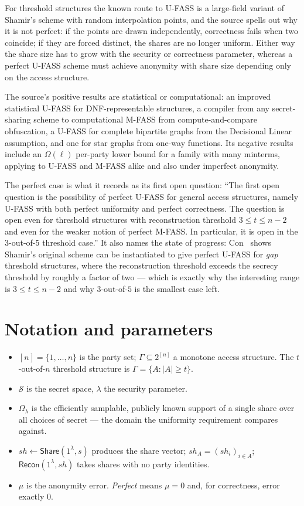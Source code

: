 \documentclass{aicr-conjecture}
\newcommand{\Sh}{\mathcal{S}}
\newcommand{\Om}{\Omega}
\newcommand{\Share}{\mathsf{Share}}
\newcommand{\Recon}{\mathsf{Recon}}
\begin{document}
For threshold structures the known route to U-FASS is a large-field
variant of Shamir's scheme with random interpolation points, and the
source spells out why it is not perfect: if the points are drawn
independently, correctness fails when two coincide; if they are forced
distinct, the shares are no longer uniform. Either way the share size has
to grow with the security or correctness parameter, whereas a perfect
U-FASS scheme must achieve anonymity with share size depending only on
the access structure.

The source's positive results are statistical or computational: an
improved statistical U-FASS for DNF-representable structures, a
compiler from any secret-sharing scheme to computational M-FASS from
compute-and-compare obfuscation, a U-FASS for complete bipartite graphs
from the Decisional Linear assumption, and one for star graphs from
one-way functions. Its negative results include an $\Om(\ell)$ per-party
lower bound for a family with many minterms, applying to U-FASS and
M-FASS alike and also under imperfect anonymity.

The perfect case is what it records as its first open question: ``The
first open question is the possibility of perfect U-FASS for general
access structures, namely U-FASS with both perfect uniformity and perfect
correctness. The question is open even for threshold structures with
reconstruction threshold $3 \le t \le n-2$ and even for the weaker notion
of perfect M-FASS\@. In particular, it is open in the 3-out-of-5 threshold
case.'' It also names the state of progress: Con~\cite{Con24} shows
Shamir's original scheme can be instantiated to give perfect U-FASS for
\emph{gap} threshold structures, where the reconstruction threshold
exceeds the secrecy threshold by roughly a factor of two --- which is
exactly why the interesting range is $3 \le t \le n-2$ and why
$3$-out-of-$5$ is the smallest case left.

\section{Notation and parameters}\label{sec:notation}

\begin{itemize}[nosep]
  \item $[n] = \{1, \dots, n\}$ is the party set; $\Gamma \subseteq
    2^{[n]}$ a monotone access structure. The $t$-out-of-$n$ threshold
    structure is $\Gamma = \{A : |A| \ge t\}$.
  \item $\Sh$ is the secret space, $\lambda$ the security parameter.
  \item $\Omega_{\lambda}$ is the efficiently samplable, publicly known
    support of a single share over all choices of secret --- the domain
    the uniformity requirement compares against.
  \item $sh \leftarrow \Share(1^{\lambda}, s)$ produces the share vector;
    $sh_{A} = (sh_{i})_{i \in A}$; $\Recon(1^{\lambda}, sh)$ takes shares
    with no party identities.
  \item $\mu$ is the anonymity error. \emph{Perfect} means $\mu = 0$ and,
    for correctness, error exactly $0$.
\end{itemize}
\end{document}
